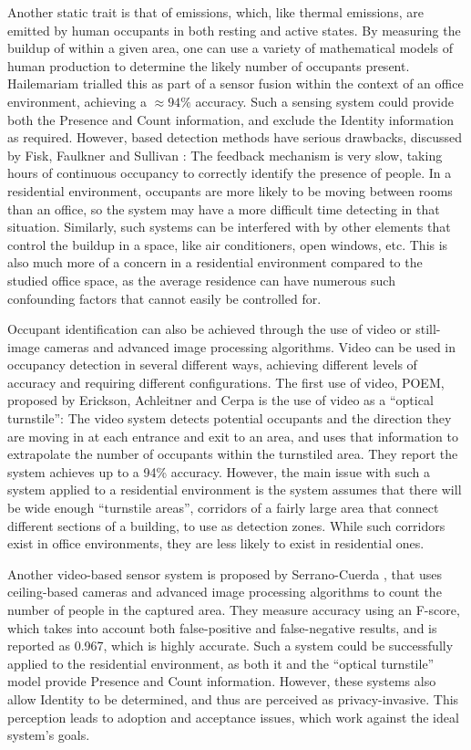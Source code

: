 \documentclass[../thesis/thesis.tex]{subfiles}
\begin{document}
Another static trait is that of \cdi emissions, which, like thermal emissions, are emitted by human occupants in both resting and active states. By measuring the buildup of \cdi within a given area, one can use a variety of mathematical models of human \cdi production to determine the likely number of occupants present. Hailemariam \etal \cite{hailemariam2011real} trialled this as part of a sensor fusion within the context of an office environment, achieving a $\approx94\%$ accuracy. Such a sensing system could provide both the Presence and Count information, and exclude the Identity information as required. However, \cdi based detection methods have serious drawbacks, discussed by Fisk, Faulkner and Sullivan \cite{fisk2006accuracy}: The \cdi feedback mechanism is very slow, taking hours of continuous occupancy to correctly identify the presence of people. In a residential environment, occupants are more likely to be moving between rooms than an office, so the system may have a more difficult time detecting in that situation. Similarly, such systems can be interfered with by other elements that control the \cdi buildup in a space, like air conditioners, open windows, etc. This is also much more of a concern in a residential environment compared to the studied office space, as the average residence can have numerous such confounding factors that cannot easily be controlled for.

Occupant identification can also be achieved through the use of video or still-image cameras and advanced image processing algorithms. Video can be used in occupancy detection in several different ways, achieving different levels of accuracy and requiring different configurations. The first use of video, POEM, proposed by Erickson, Achleitner and Cerpa \cite{erickson2013poem} is the use of video as a ``optical turnstile'': The video system detects potential occupants and the direction they are moving in at each entrance and exit to an area, and uses that information to extrapolate the number of occupants within the turnstiled area. They report the system achieves up to a 94\% accuracy. However, the main issue with such a system applied to a residential environment is the system assumes that there will be wide enough ``turnstile areas'', corridors of a fairly large area that connect different sections of a building, to use as detection zones. While such corridors exist in office environments, they are less likely to exist in residential ones.

Another video-based sensor system is proposed by Serrano-Cuerda \etal \cite{serrano2013efficient}, that uses ceiling-based cameras and advanced image processing algorithms to count the number of people in the captured area. They measure accuracy using an F-score, which takes into account both false-positive and false-negative results, and is reported as 0.967, which is highly accurate. Such a system could be successfully applied to the residential environment, as both it and the ``optical turnstile'' model provide Presence and Count information. However, these systems also allow Identity to be determined, and thus are perceived as privacy-invasive. This perception leads to adoption and acceptance issues, which work against the ideal system's goals.
\end{document}
